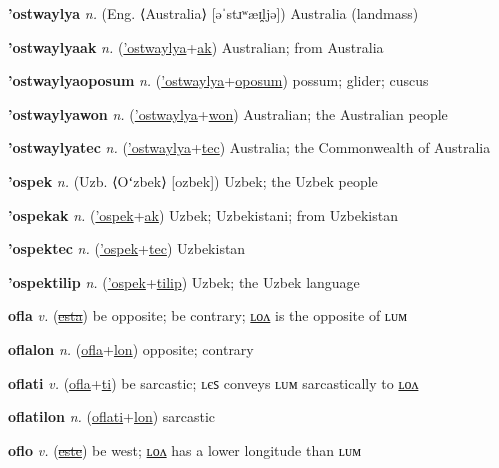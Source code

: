 \textbf{\hypertarget{'ostwaylya}{'ostwaylya}} \textit{n.} (Eng. ⟨Australia⟩ [əˈstɹʷæɪ̯ljə])
Australia (landmass)

\textbf{\hypertarget{'ostwaylyaak}{'ostwaylyaak}} \textit{n.} (\hyperlink{'ostwaylya}{'ostwaylya}+\allowbreak \hyperlink{ak}{ak})
Australian; from Australia

\textbf{\hypertarget{'ostwaylyaoposum}{'ostwaylyaoposum}} \textit{n.} (\hyperlink{'ostwaylya}{'ostwaylya}+\allowbreak \hyperlink{oposum}{oposum})
possum; glider; cuscus

\textbf{\hypertarget{'ostwaylyawon}{'ostwaylyawon}} \textit{n.} (\hyperlink{'ostwaylya}{'ostwaylya}+\allowbreak \hyperlink{won}{won})
Australian; the Australian people

\textbf{\hypertarget{'ostwaylyatec}{'ostwaylyatec}} \textit{n.} (\hyperlink{'ostwaylya}{'ostwaylya}+\allowbreak \hyperlink{tec}{tec})
Australia; the Commonwealth of Australia

\textbf{\hypertarget{'ospek}{'ospek}} \textit{n.} (Uzb. ⟨Oʻzbek⟩ [ozbek])
Uzbek; the Uzbek people

\textbf{\hypertarget{'ospekak}{'ospekak}} \textit{n.} (\hyperlink{'ospek}{'ospek}+\allowbreak \hyperlink{ak}{ak})
Uzbek; Uzbekistani; from Uzbekistan

\textbf{\hypertarget{'ospektec}{'ospektec}} \textit{n.} (\hyperlink{'ospek}{'ospek}+\allowbreak \hyperlink{tec}{tec})
Uzbekistan

\textbf{\hypertarget{'ospektilip}{'ospektilip}} \textit{n.} (\hyperlink{'ospek}{'ospek}+\allowbreak \hyperlink{tilip}{tilip})
Uzbek; the Uzbek language

\textbf{\hypertarget{ofla}{ofla}} \textit{v.} (\hyperlink{esta}{\sout{esta}})
be opposite; be contrary; \hyperlink{oflalon}{ʟᴏᴧ} is the opposite of ʟᴜᴍ

\textbf{\hypertarget{oflalon}{oflalon}} \textit{n.} (\hyperlink{ofla}{ofla}+\allowbreak \hyperlink{lon}{lon})
opposite; contrary

\textbf{\hypertarget{oflati}{oflati}} \textit{v.} (\hyperlink{ofla}{ofla}+\allowbreak \hyperlink{ti}{ti})
be sarcastic; ʟєꜱ conveys ʟᴜᴍ sarcastically to \hyperlink{oflatilon}{ʟᴏᴧ}

\textbf{\hypertarget{oflatilon}{oflatilon}} \textit{n.} (\hyperlink{oflati}{oflati}+\allowbreak \hyperlink{lon}{lon})
sarcastic

\textbf{\hypertarget{oflo}{oflo}} \textit{v.} (\hyperlink{este}{\sout{este}})
be west; \hyperlink{oflolon}{ʟᴏᴧ} has a lower longitude than ʟᴜᴍ

